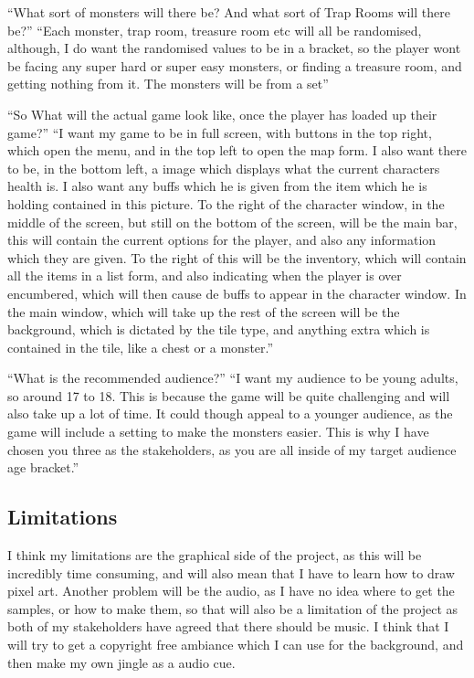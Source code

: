 \documentclass[12pt]{article}
\begin{document}
“What sort of monsters will there be? And what sort of Trap Rooms will there be?”
“Each monster, trap room, treasure room etc will all be randomised, although, I do want the randomised values to be in a bracket, so the player wont be facing any super hard or super easy monsters, or finding a treasure room, and getting nothing from it. The monsters will be from a set”

“So What will the actual game look like, once the player has loaded up their game?”
“I want my game to be in full screen, with buttons in the top right, which open the menu, and in the top left to open the map form. I also want there to be, in the bottom left, a image which displays what the current characters health is. I also want any buffs which he is given from the item which he is holding contained in this picture. To the right of the character window, in the middle of the screen, but still on the bottom of the screen, will be the main bar, this will contain the current options for the player, and also any information which they are given. To the right of this will be the inventory, which will contain all the items in a list form, and also indicating when the player is over encumbered, which will then cause de buffs to appear in the character window. In the main window, which will take up the rest of the screen will be the background, which is dictated by the tile type, and anything extra which is contained in the tile, like a chest or a monster.”

“What is the recommended audience?”
“I want my audience to be young adults, so around 17 to 18. This is because the game will be quite challenging and will also take up a lot of time. It could though appeal to a younger audience, as the game will include a setting to make the monsters easier. This is why I have chosen you three as the stakeholders, as you are all inside of my target audience age bracket.”

		
		\subsection{Limitations}

I think my limitations are the graphical side of the project, as this will be incredibly time consuming, and will also mean that I have to learn how to draw pixel art. Another problem will be the audio, as I have no idea where to get the samples, or how to make them, so that will also be a limitation of the project as both of my stakeholders have agreed that there should be music. I think that I will try to get a copyright free ambiance which I can use for the background, and then make my own jingle as a audio cue.
\end{document}
